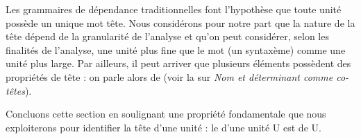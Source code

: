 \begin{sloppypar}
Les grammaires de dépendance traditionnelles font l’hypothèse que toute unité possède un unique mot tête. Nous considérons pour notre part que la nature de la tête dépend de la granularité de l’analyse et qu’on peut considérer, selon les finalités de l’analyse, une unité plus fine que le mot (un syntaxème) comme une unité plus large. Par ailleurs, il peut arriver que plusieurs éléments possèdent des propriétés de tête : on parle alors de  (voir la  sur \textit{Nom et déterminant comme co-têtes}).
\end{sloppypar}

Concluons cette section en soulignant une propriété fondamentale que nous exploiterons pour identifier la tête d’une unité : le  d’une unité U est  de U.

